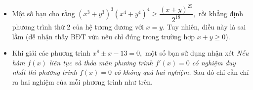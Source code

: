\begin{bt}
{		 
\begin{itemize}
	\item  Một số bạn cho rằng $\left(x^3+y^3\right)^3\left(x^4+y^4\right)^4\ge \dfrac{(x+y)^{25}}{2^{18}},$ rồi khẳng định phương trình thứ 2 của hệ tương đương với $x=y.$ Tuy nhiên, điều này là sai lầm (dễ nhận thấy BĐT vừa nêu chỉ đúng trong trường hợp $x+y\ge 0$).
\item  Khi giải các phương trình $x^8\pm x-13=0,$ một số bạn sử dụng nhận xét \textit{ Nếu hàm $f(x)$ liên tục và thỏa mãn phương trình $f'(x)=0$ có nghiệm duy nhất thì phương trình $f(x)=0$ có không quá hai nghiệm.} Sau đó chỉ cần chỉ ra hai nghiệm của mỗi phương trình như trên.
\end{itemize}
	}
\end{bt}

